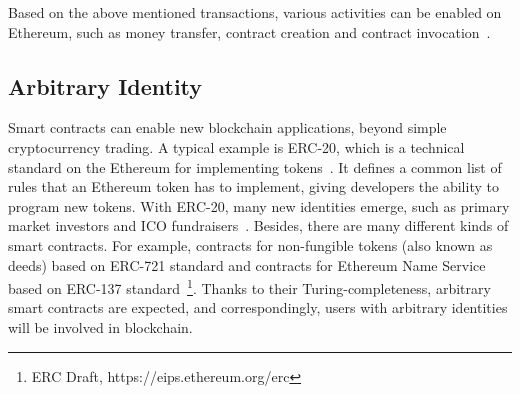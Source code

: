



Based on the above mentioned transactions, various activities can be enabled on Ethereum, such as money transfer, contract creation and contract invocation~\cite{chen2018infocom}.


\subsection{Arbitrary Identity}
Smart contracts can enable new blockchain applications, beyond simple cryptocurrency trading. A typical example is ERC-20, which is a technical standard on the Ethereum for implementing tokens~\cite{erc-20-wiki}. It defines a common list of rules that an Ethereum token has to implement, giving developers the ability to program new tokens. With ERC-20, many new identities emerge, such as primary market investors and ICO fundraisers~\cite{cerchiello2018icos}. Besides, there are many different kinds of smart contracts. For example, contracts for non-fungible tokens (also known as deeds) based on ERC-721 standard and contracts for Ethereum Name Service based on ERC-137 standard~\footnote{ERC Draft, https://eips.ethereum.org/erc}. Thanks to their Turing-completeness, arbitrary smart contracts are expected, and correspondingly, users with arbitrary identities will be involved in blockchain.

